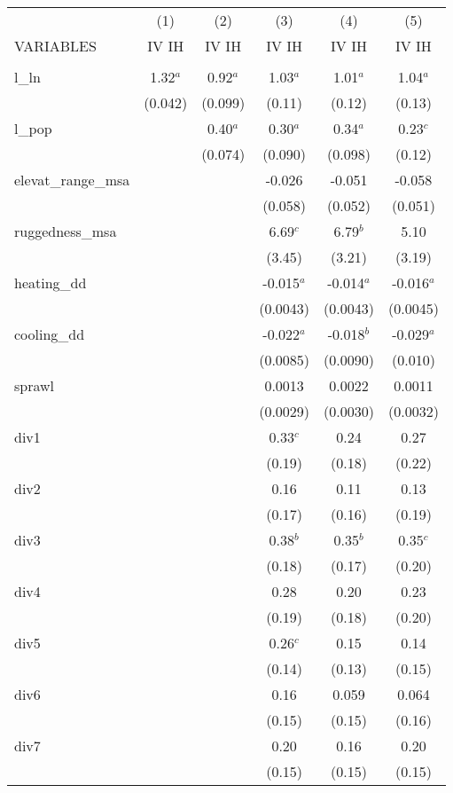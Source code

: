 \documentclass[]{article}
\begin{document}
\begin{tabular}{lccccc} \hline
 & (1) & (2) & (3) & (4) & (5) \\
VARIABLES & IV IH & IV IH & IV IH & IV IH & IV IH \\ \hline
 &  &  &  &  &  \\
l\_ln & 1.32$^a$ & 0.92$^a$ & 1.03$^a$ & 1.01$^a$ & 1.04$^a$ \\
 & (0.042) & (0.099) & (0.11) & (0.12) & (0.13) \\
l\_pop &  & 0.40$^a$ & 0.30$^a$ & 0.34$^a$ & 0.23$^c$ \\
 &  & (0.074) & (0.090) & (0.098) & (0.12) \\
elevat\_range\_msa &  &  & -0.026 & -0.051 & -0.058 \\
 &  &  & (0.058) & (0.052) & (0.051) \\
ruggedness\_msa &  &  & 6.69$^c$ & 6.79$^b$ & 5.10 \\
 &  &  & (3.45) & (3.21) & (3.19) \\
heating\_dd &  &  & -0.015$^a$ & -0.014$^a$ & -0.016$^a$ \\
 &  &  & (0.0043) & (0.0043) & (0.0045) \\
cooling\_dd &  &  & -0.022$^a$ & -0.018$^b$ & -0.029$^a$ \\
 &  &  & (0.0085) & (0.0090) & (0.010) \\
sprawl &  &  & 0.0013 & 0.0022 & 0.0011 \\
 &  &  & (0.0029) & (0.0030) & (0.0032) \\
div1 &  &  & 0.33$^c$ & 0.24 & 0.27 \\
 &  &  & (0.19) & (0.18) & (0.22) \\
div2 &  &  & 0.16 & 0.11 & 0.13 \\
 &  &  & (0.17) & (0.16) & (0.19) \\
div3 &  &  & 0.38$^b$ & 0.35$^b$ & 0.35$^c$ \\
 &  &  & (0.18) & (0.17) & (0.20) \\
div4 &  &  & 0.28 & 0.20 & 0.23 \\
 &  &  & (0.19) & (0.18) & (0.20) \\
div5 &  &  & 0.26$^c$ & 0.15 & 0.14 \\
 &  &  & (0.14) & (0.13) & (0.15) \\
div6 &  &  & 0.16 & 0.059 & 0.064 \\
 &  &  & (0.15) & (0.15) & (0.16) \\
div7 &  &  & 0.20 & 0.16 & 0.20 \\
 &  &  & (0.15) & (0.15) & (0.15) \\

\end{tabular}
\end{document}
